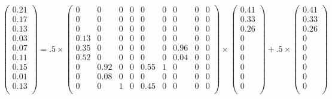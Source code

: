 \begin{equation}\label{eq:random_walk_iter1}
\left(
\begin{matrix}
0.21\\
0.17\\
0.13\\
0.03\\
0.07\\
0.11\\
0.15\\
0.01\\
0.13\\
\end{matrix}
\right)
=.5\times
\left(
\begin{matrix}
0 & 0 & 0 & 0 & 0 & 0 & 0 & 0 & 0\\
0 & 0 & 0 & 0 & 0 & 0 & 0 & 0 & 0\\
0 & 0 & 0 & 0 & 0 & 0 & 0 & 0 & 0\\
0.13 & 0 & 0 & 0 & 0 & 0 & 0 & 0 & 0\\
0.35 & 0 & 0 & 0 & 0 & 0 & 0.96 & 0 & 0\\
0.52 & 0 & 0 & 0 & 0 & 0 & 0.04 & 0 & 0\\
0 & 0.92 & 0 & 0 & 0.55 & 1 & 0 & 0 & 0\\
0 & 0.08 & 0 & 0 & 0 & 0 & 0 & 0 & 0\\
0 & 0 & 1 & 0 & 0.45 & 0 & 0 & 0 & 0\\
\end{matrix}
\right)\times
\left(
\begin{matrix}
0.41\\
0.33\\
0.26\\
0\\
0\\
0\\
0\\
0\\
0\\
\end{matrix}
\right)+
.5\times
\left(
\begin{matrix}
0.41\\
0.33\\
0.26\\
0\\
0\\
0\\
0\\
0\\
0\\
\end{matrix}
\right)
\end{equation}

